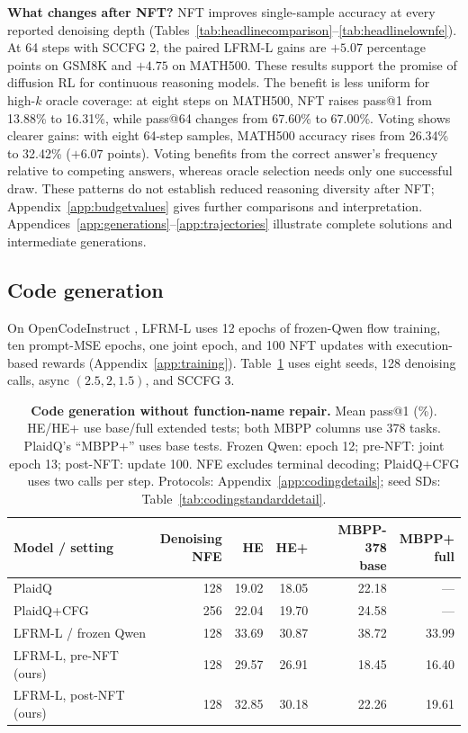 \documentclass{article}
\begin{document}
\textbf{What changes after NFT?}
\label{sec:nftresults}
NFT improves single-sample accuracy at every reported denoising depth (Tables~\ref{tab:headlinecomparison}--\ref{tab:headlinelownfe}). At 64 steps with SCCFG 2, the paired LFRM-L gains are $+5.07$ percentage points on GSM8K and $+4.75$ on MATH500. These results support the promise of diffusion RL for continuous reasoning models. The benefit is less uniform for high-$k$ oracle coverage: at eight steps on MATH500, NFT raises pass@1 from 13.88\% to 16.31\%, while pass@64 changes from 67.60\% to 67.00\%. Voting shows clearer gains: with eight 64-step samples, MATH500 accuracy rises from 26.34\% to 32.42\% ($+6.07$ points). Voting benefits from the correct answer's frequency relative to competing answers, whereas oracle selection needs only one successful draw. These patterns do not establish reduced reasoning diversity after NFT; Appendix~\ref{app:budgetvalues} gives further comparisons and interpretation. Appendices~\ref{app:generations}--\ref{app:trajectories} illustrate complete solutions and intermediate generations.

\subsection{Code generation}
\label{sec:codingresults}

On OpenCodeInstruct \citep{opencodeinstruct}, LFRM-L uses 12 epochs of frozen-Qwen flow training, ten prompt-MSE epochs, one joint epoch, and 100 NFT updates with execution-based rewards (Appendix~\ref{app:training}). Table~\ref{tab:codingcomparison} uses eight seeds, 128 denoising calls, async $(2.5,2,1.5)$, and SCCFG 3.

\begin{table}[!htb]
\centering\small
\setlength{\tabcolsep}{4pt}
\caption{\textbf{Code generation without function-name repair.} Mean pass@1 (\%). HE/HE+ use base/full extended tests; both MBPP columns use 378 tasks. PlaidQ's ``MBPP+'' uses base tests. Frozen Qwen: epoch 12; pre-NFT: joint epoch 13; post-NFT: update 100. NFE excludes terminal decoding; PlaidQ+CFG uses two calls per step. Protocols: Appendix~\ref{app:codingdetails}; seed SDs: Table~\ref{tab:codingstandarddetail}.}
\label{tab:codingcomparison}
\begin{tabular}{@{}lrrrrr@{}}
\toprule
Model / setting & \shortstack{Denoising\\NFE} & HE & HE+ & \shortstack{MBPP-378\\base} & \shortstack{MBPP+\\full} \\
\midrule
PlaidQ \citep{plaidq} & 128 & 19.02 & 18.05 & 22.18 & ---\\
PlaidQ+CFG \citep{plaidq} & 256 & 22.04 & 19.70 & 24.58 & ---\\
\midrule
LFRM-L / frozen Qwen & 128 & 33.69 & 30.87 & 38.72 & 33.99\\
\midrule
LFRM-L, pre-NFT (ours) & 128 & 29.57 & 26.91 & 18.45 & 16.40\\
LFRM-L, post-NFT (ours) & 128 & 32.85 & 30.18 & 22.26 & 19.61\\
\bottomrule
\end{tabular}
\end{table}
\end{document}
